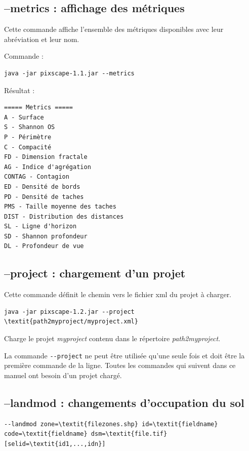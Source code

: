 \documentclass{report}
\begin{document}
\subsection{--metrics : affichage des métriques}
Cette commande affiche l'ensemble des métriques disponibles avec leur abréviation et leur nom. 

Commande :
\begin{Verbatim}
java -jar pixscape-1.1.jar --metrics
\end{Verbatim}
Résultat :
\begin{Verbatim}
===== Metrics =====
A - Surface
S - Shannon OS
P - Périmètre
C - Compacité
FD - Dimension fractale
AG - Indice d'agrégation
CONTAG - Contagion
ED - Densité de bords
PD - Densité de taches
PMS - Taille moyenne des taches
DIST - Distribution des distances
SL - Ligne d'horizon
SD - Shannon profondeur
DL - Profondeur de vue
\end{Verbatim}

\subsection{--project : chargement d'un projet}
Cette commande définit le chemin vers le fichier xml du projet à charger.
\begin{Verbatim}[commandchars=\\\{\}]
java -jar pixscape-1.2.jar --project \textit{path2myproject/myproject.xml}
\end{Verbatim}
Charge le projet \textit{myproject} contenu dans le répertoire \textit{path2myproject}.

La commande \verb|--project| ne peut être utilisée qu'une seule fois et doit être la première commande de la ligne.
Toutes les commandes qui suivent dans ce manuel ont besoin d'un projet chargé.

\subsection{--landmod : changements d'occupation du sol}

\begin{Verbatim}[commandchars=\\\{\}]
--landmod zone=\textit{filezones.shp} id=\textit{fieldname} code=\textit{fieldname} dsm=\textit{file.tif} [selid=\textit{id1,...,idn}]
\end{Verbatim}
\end{document}
